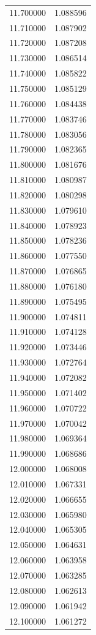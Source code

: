 \begin{tabular}{rr}
11.700000 & 1.088596 \\
11.710000 & 1.087902 \\
11.720000 & 1.087208 \\
11.730000 & 1.086514 \\
11.740000 & 1.085822 \\
11.750000 & 1.085129 \\
11.760000 & 1.084438 \\
11.770000 & 1.083746 \\
11.780000 & 1.083056 \\
11.790000 & 1.082365 \\
11.800000 & 1.081676 \\
11.810000 & 1.080987 \\
11.820000 & 1.080298 \\
11.830000 & 1.079610 \\
11.840000 & 1.078923 \\
11.850000 & 1.078236 \\
11.860000 & 1.077550 \\
11.870000 & 1.076865 \\
11.880000 & 1.076180 \\
11.890000 & 1.075495 \\
11.900000 & 1.074811 \\
11.910000 & 1.074128 \\
11.920000 & 1.073446 \\
11.930000 & 1.072764 \\
11.940000 & 1.072082 \\
11.950000 & 1.071402 \\
11.960000 & 1.070722 \\
11.970000 & 1.070042 \\
11.980000 & 1.069364 \\
11.990000 & 1.068686 \\
12.000000 & 1.068008 \\
12.010000 & 1.067331 \\
12.020000 & 1.066655 \\
12.030000 & 1.065980 \\
12.040000 & 1.065305 \\
12.050000 & 1.064631 \\
12.060000 & 1.063958 \\
12.070000 & 1.063285 \\
12.080000 & 1.062613 \\
12.090000 & 1.061942 \\
12.100000 & 1.061272 \\

\end{tabular}
